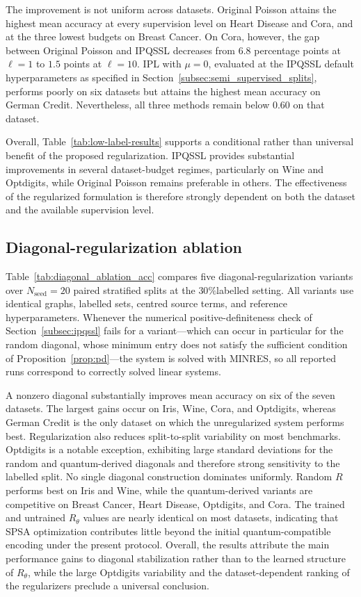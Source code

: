 \documentclass[11pt,a4paper]{article}
\begin{document}
The improvement is not uniform across datasets. Original Poisson attains
the highest mean accuracy at every supervision level on Heart Disease and
Cora, and at the three lowest budgets on Breast Cancer. On Cora, however,
the gap between Original Poisson and \textsc{IPQSSL} decreases from
\(6.8\) percentage points at \(\ell=1\) to \(1.5\) points at
\(\ell=10\). IPL with \(\mu=0\), evaluated at the IPQSSL default
hyperparameters as specified in Section~\ref{subsec:semi_supervised_splits},
performs poorly on six datasets but attains the highest mean accuracy on
German Credit. Nevertheless, all three methods remain below \(0.60\) on
that dataset.

Overall, Table~\ref{tab:low-label-results} supports a conditional rather
than universal benefit of the proposed regularization. \textsc{IPQSSL}
provides substantial improvements in several dataset-budget regimes,
particularly on Wine and Optdigits, while Original Poisson remains preferable
in others. The effectiveness of the regularized formulation is therefore
strongly dependent on both the dataset and the available supervision level.


\subsection{Diagonal-regularization ablation}
\label{subsec:diagonal_ablation}

Table~\ref{tab:diagonal_ablation_acc} compares five diagonal-regularization
variants over \(N_{\mathrm{seed}}=20\) paired stratified splits at the
\(30\%\)labelled setting. All variants use identical graphs, labelled sets,
centred source terms, and reference hyperparameters. Whenever the numerical
positive-definiteness check of Section~\ref{subsec:ipqssl} fails for a
variant---which can occur in particular for the random diagonal, whose
minimum entry does not satisfy the sufficient condition of
Proposition~\ref{prop:pd}---the system is solved with MINRES, so all
reported runs correspond to correctly solved linear systems.

A nonzero diagonal substantially improves mean accuracy on six of the seven
datasets. The largest gains occur on Iris, Wine, Cora, and Optdigits, whereas
German Credit is the only dataset on which the unregularized system performs
best. Regularization also reduces split-to-split variability on most
benchmarks. Optdigits is a notable exception, exhibiting large standard
deviations for the random and quantum-derived diagonals and therefore strong
sensitivity to the labelled split.
No single diagonal construction dominates uniformly. Random \(R\) performs
best on Iris and Wine, while the quantum-derived variants are competitive on
Breast Cancer, Heart Disease, Optdigits, and Cora. The trained and untrained
\(R_\theta\) values are nearly identical on most datasets, indicating that
SPSA optimization contributes little beyond the initial quantum-compatible
encoding under the present protocol. Overall, the results attribute the main
performance gains to diagonal stabilization rather than to the learned
structure of \(R_\theta\), while the large Optdigits variability and the
dataset-dependent ranking of the regularizers preclude a universal
conclusion.
\end{document}
